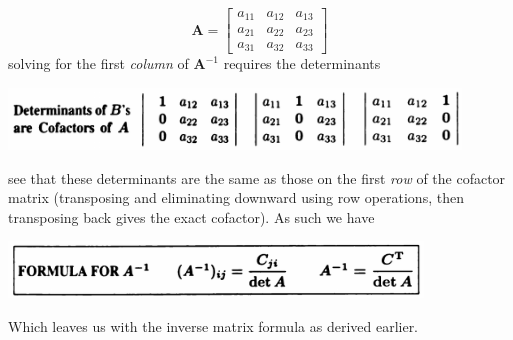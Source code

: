 \documentclass{report}
\begin{document}
\begin{equation*}
\bm A=\left[\begin{array}{ccc}
a_{11}&a_{12}&a_{13}\\
a_{21}&a_{22}&a_{23}\\
a_{31}&a_{32}&a_{33}
\end{array}\right]
\end{equation*}
solving for the first \textit{column} of $\bm A^{-1}$ requires the determinants
\begin{center}
\includegraphics[width=12cm]{108}
\end{center}
see that these determinants are the same as those on the first \textit{row} of the cofactor matrix 
(transposing and eliminating downward using row operations, then transposing back gives the exact cofactor). As such we have
\begin{center}
\includegraphics[width=11cm]{109}
\end{center}
Which leaves us with the inverse matrix formula as derived earlier.
\newpage
\end{document}
